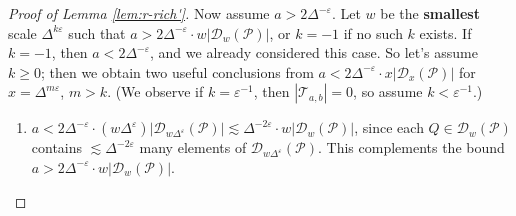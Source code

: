 \documentclass{amsart}
\newcommand{\T}{\mathcal{T}}
\newcommand{\eps}{\varepsilon}
\newcommand{\lesim}{\lesssim}
\newcommand{\cD}{\mathcal{D}}
\newcommand{\cP}{\mathcal{P}}
\begin{document}
\begin{proof}[Proof of Lemma \ref{lem:r-rich'}]
    Now assume $a > 2\Delta^{-\eps}$. Let $w$ be the \textbf{smallest} scale $\Delta^{k \eps}$ such that $a > 2\Delta^{-\eps} \cdot w|\cD_w (\cP)|$, or $k = -1$ if no such $k$ exists. If $k = -1$, then $a < 2\Delta^{-\eps}$, and we already considered this case. So let's assume $k \ge 0$; then we obtain two useful conclusions from $a < 2\Delta^{-\eps} \cdot x|\cD_x (\cP)|$ for $x = \Delta^{m \eps}$, $m > k$. (We observe if $k = \eps^{-1}$, then $|\T_{a,b}| = 0$, so assume $k < \eps^{-1}$.)
    \begin{enumerate}[(C1)]
        \item\label{conc1} $a < 2\Delta^{-\eps} \cdot (w\Delta^\eps) |\cD_{w\Delta^\eps} (\cP)| \lesim \Delta^{-2\eps} \cdot w|\cD_w (\cP)|$, since each $Q \in \cD_w (\cP)$ contains $\lesim \Delta^{-2\eps}$ many elements of $\cD_{w\Delta^\eps} (\cP)$. This complements the bound $a > 2\Delta^{-\eps} \cdot w|\cD_w (\cP)|$. 


\end{enumerate}
\end{proof}
\end{document}
